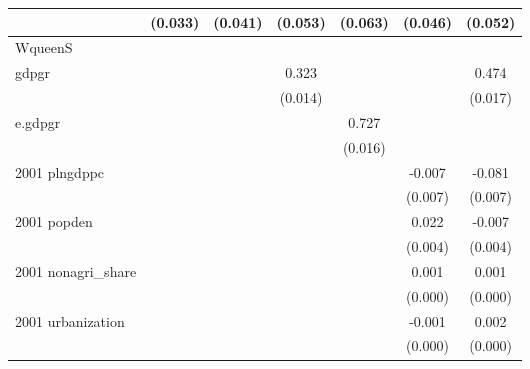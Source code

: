 \begin{table}[htbp]
\begin{tabular}{l*{6}{c}}
                    &     (0.033)         &     (0.041)         &     (0.053)         &     (0.063)         &     (0.046)         &     (0.052)         \\
\hline
WqueenS             &                     &                     &                     &                     &                     &                     \\
gdpgr               &                     &                     &       0.323\sym{***}&                     &                     &       0.474\sym{***}\\
                    &                     &                     &     (0.014)         &                     &                     &     (0.017)         \\
e.gdpgr             &                     &                     &                     &       0.727\sym{***}&                     &                     \\
                    &                     &                     &                     &     (0.016)         &                     &                     \\
2001 plngdppc       &                     &                     &                     &                     &      -0.007         &      -0.081\sym{***}\\
                    &                     &                     &                     &                     &     (0.007)         &     (0.007)         \\
2001 popden         &                     &                     &                     &                     &       0.022\sym{***}&      -0.007\sym{**} \\
                    &                     &                     &                     &                     &     (0.004)         &     (0.004)         \\
2001 nonagri\_share  &                     &                     &                     &                     &       0.001\sym{***}&       0.001\sym{***}\\
                    &                     &                     &                     &                     &     (0.000)         &     (0.000)         \\
2001 urbanization   &                     &                     &                     &                     &      -0.001\sym{***}&       0.002\sym{***}\\
                    &                     &                     &                     &                     &     (0.000)         &     (0.000)         \\

\end{tabular}
\end{table}
